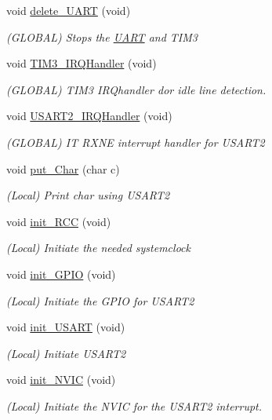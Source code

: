 \begin{DoxyCompactItemize}
void \mbox{\hyperlink{namespace_u_a_r_t_ab7d8037afb7dff98f21b6a07b3fc2158}{delete\+\_\+\+U\+A\+RT}} (void)
\begin{DoxyCompactList}\small\item\em (G\+L\+O\+B\+AL) Stops the \mbox{\hyperlink{namespace_u_a_r_t}{U\+A\+RT}} and T\+I\+M3 \end{DoxyCompactList}\item 
void \mbox{\hyperlink{namespace_u_a_r_t_ac8e51d2183b5230cbd5481f8867adce9}{T\+I\+M3\+\_\+\+I\+R\+Q\+Handler}} (void)
\begin{DoxyCompactList}\small\item\em (G\+L\+O\+B\+AL) T\+I\+M3 I\+R\+Qhandler dor idle line detection. \end{DoxyCompactList}\item 
void \mbox{\hyperlink{namespace_u_a_r_t_a0ca6fd0e6f77921dd1123539857ba0a8}{U\+S\+A\+R\+T2\+\_\+\+I\+R\+Q\+Handler}} (void)
\begin{DoxyCompactList}\small\item\em (G\+L\+O\+B\+AL) IT R\+X\+NE interrupt handler for U\+S\+A\+R\+T2 \end{DoxyCompactList}\item 
void \mbox{\hyperlink{namespace_u_a_r_t_ae9667edee69ced0a5f4ada356f4a4fa1}{put\+\_\+\+Char}} (char c)
\begin{DoxyCompactList}\small\item\em (Local) Print char using U\+S\+A\+R\+T2 \end{DoxyCompactList}\item 
void \mbox{\hyperlink{namespace_u_a_r_t_a532deb6ee0fb4aa5ef9700438be59c0f}{init\+\_\+\+R\+CC}} (void)
\begin{DoxyCompactList}\small\item\em (Local) Initiate the needed systemclock \end{DoxyCompactList}\item 
void \mbox{\hyperlink{namespace_u_a_r_t_a92da5727d9a24141d77c8acb1fc776d0}{init\+\_\+\+G\+P\+IO}} (void)
\begin{DoxyCompactList}\small\item\em (Local) Initiate the G\+P\+IO for U\+S\+A\+R\+T2 \end{DoxyCompactList}\item 
void \mbox{\hyperlink{namespace_u_a_r_t_aaa88a606dc9d9361e67a256ed1f21a83}{init\+\_\+\+U\+S\+A\+RT}} (void)
\begin{DoxyCompactList}\small\item\em (Local) Initiate U\+S\+A\+R\+T2 \end{DoxyCompactList}\item 
void \mbox{\hyperlink{namespace_u_a_r_t_aa21807f2e7d59396d1c411f436ebd29b}{init\+\_\+\+N\+V\+IC}} (void)
\begin{DoxyCompactList}\small\item\em (Local) Initiate the N\+V\+IC for the U\+S\+A\+R\+T2 interrupt. \end{DoxyCompactList}\end{DoxyCompactItemize}
